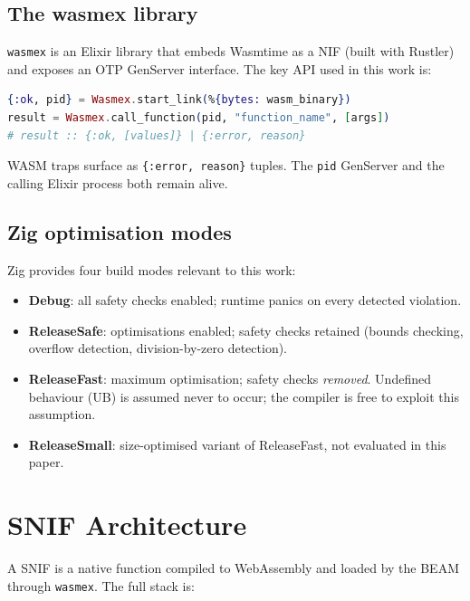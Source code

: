 \documentclass[11pt,a4paper]{article}
\begin{document}
\subsection{The wasmex library}

\texttt{wasmex} is an Elixir library that embeds Wasmtime as a NIF (built with
Rustler) and exposes an OTP GenServer interface. The key API used in this work is:

\begin{lstlisting}[language=Elixir, caption={wasmex 0.14 calling convention}]
{:ok, pid} = Wasmex.start_link(%{bytes: wasm_binary})
result = Wasmex.call_function(pid, "function_name", [args])
# result :: {:ok, [values]} | {:error, reason}
\end{lstlisting}

WASM traps surface as \texttt{\{:error, reason\}} tuples. The \texttt{pid}
GenServer and the calling Elixir process both remain alive.

\subsection{Zig optimisation modes}

Zig provides four build modes relevant to this work:

\begin{itemize}
  \item \textbf{Debug}: all safety checks enabled; runtime panics on every
        detected violation.
  \item \textbf{ReleaseSafe}: optimisations enabled; safety checks retained
        (bounds checking, overflow detection, division-by-zero detection).
  \item \textbf{ReleaseFast}: maximum optimisation; safety checks \emph{removed}.
        Undefined behaviour (UB) is assumed never to occur; the compiler is
        free to exploit this assumption.
  \item \textbf{ReleaseSmall}: size-optimised variant of ReleaseFast, not
        evaluated in this paper.
\end{itemize}

\section{SNIF Architecture}
\label{sec:architecture}

A SNIF is a native function compiled to WebAssembly and loaded by the BEAM
through \texttt{wasmex}. The full stack is:
\end{document}
